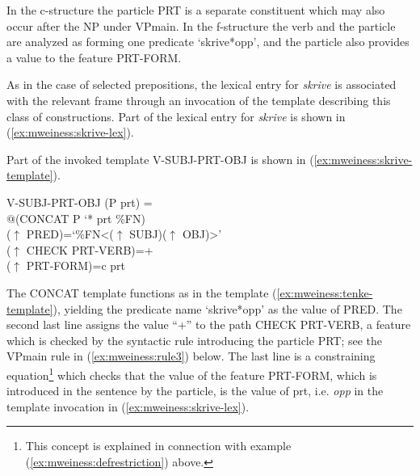 \documentclass[output=paper]{langsci/langscibook}
\begin{document}

In the c-structure the particle PRT is a separate constituent which may also occur after the NP under VPmain.
In the f-structure the verb and the particle are analyzed as forming one predicate `skrive*opp', and the particle also provides a value to the feature PRT-FORM.

As in the case of selected prepositions, the lexical entry for \textit{skrive} is associated with the relevant frame through an invocation of the template describing this class of constructions.
Part of the lexical entry for \textit{skrive} is shown in  (\ref{ex:mweiness:skrive-lex}).


Part of the invoked template V-SUBJ-PRT-OBJ is shown in  (\ref{ex:mweiness:skrive-template}).

\ea\label{ex:mweiness:skrive-template}
{\small 
V-SUBJ-PRT-OBJ (P prt) =\\
\hspace{2em} @(CONCAT P `* prt \%FN)\\
\hspace{2em}  ($\uparrow$ PRED)=`\%FN<($\uparrow$ SUBJ)($\uparrow$ OBJ)>'\\
\hspace{2em}  ($\uparrow$ CHECK PRT-VERB)=+\\
\hspace{2em}  ($\uparrow$ PRT-FORM)=c prt
}
\z

The CONCAT template functions as in the template (\ref{ex:mweiness:tenke-template}), yielding the  predicate name `skrive*opp' as the value of PRED.
The second last line assigns the value ``+'' to the path CHECK PRT-VERB, a feature which is checked by the syntactic rule introducing the particle PRT; see the VPmain rule in (\ref{ex:mweiness:rule3}) below.
The last line is a constraining equation\footnote{This concept is explained in connection with example (\ref{ex:mweiness:defrestriction}) above.} which checks that the value of the feature PRT-FORM, which is introduced in the sentence by the particle, is the value of prt, i.e. \emph{opp} in the template invocation in (\ref{ex:mweiness:skrive-lex}).
\end{document}

